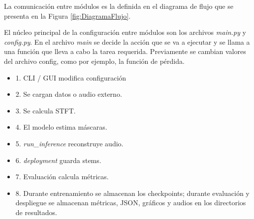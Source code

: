 La comunicación entre módulos es la definida en el diagrama de flujo que se presenta en la Figura \ref{fig:DiagramaFlujo}.

El núcleo principal de la configuración entre módulos son los archivos \textit{main.py} y \textit{config.py}. En el archivo \textit{main} se decide
la acción que se va a ejecutar y se llama a una función que lleva a cabo la tarea requerida. Previamente se cambian valores del archivo config, como por ejemplo, la función de pérdida.

\begin{itemize}
    \item 1. CLI / GUI modifica configuración
    \item 2. Se cargan datos o audio externo.
    \item 3. Se calcula STFT.
    \item 4. El modelo estima máscaras.
    \item 5. \textit{run\_inference} reconstruye audio.
    \item 6. \textit{deployment} guarda stems.
    \item 7. Evaluación calcula métricas.
    \item 8. Durante entrenamiento se almacenan los checkpoints; durante evaluación y despliegue se almacenan métricas, JSON, gráficos y audios en los directorios de resultados.
\end{itemize}
